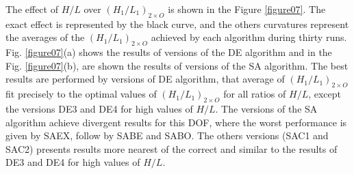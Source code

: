 \documentclass[12pt,fleqn]{article}
\begin{document}
The effect of $H/L$ over ${(H_{1}/L_{1})_{2\times O}}$ is shown in the Figure \ref{figure07}. The exact effect is represented by the black curve, and the others curvatures represent the averages of the ${(H_{1}/L_{1})_{2\times O}}$ achieved by each algorithm during thirty runs. Fig. \ref{figure07}(a) shows the results of versions of the DE algorithm and in the Fig. \ref{figure07}(b), are shown the results of versions of the SA algorithm. The best results are performed by versions of DE algorithm, that average of ${(H_{1}/L_{1})_{2\times O}}$ fit precisely to the optimal values of ${(H_{1}/L_{1})_{2\times O}}$ for all ratios of $H/L$, except the versions DE3 and DE4 for high values of $H/L$. The versions of the SA algorithm achieve divergent results for this DOF, where the worst performance is given by SAEX, follow by  SABE and SABO. The others versions (SAC1 and SAC2) presents results more nearest of the correct and similar to the results of DE3 and DE4 for high values of $H/L$.
\end{document}
